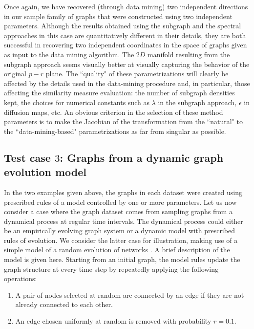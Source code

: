 Once again, we have recovered (through data mining) two independent
directions in our sample family of graphs that were constructed using
two independent parameters.
% 
Although the results obtained using the subgraph and the spectral
approaches in this case are quantitatively different in their details,
they are both successful in recovering two independent coordinates in
the space of graphs given as input to the data mining algorithm.
% 
The $2D$ manifold resulting from the subgraph approach seems visually
better at visually capturing the behavior of the original $p-r$ plane.
% 
The ``quality" of these parametrizations will clearly be affected by
the details used in the data-mining procedure and, in particular,
those affecting the similarity measure evaluation: the number of
subgraph densities kept, the choices for numerical constants such as
$\lambda$ in the subgraph approach, $\epsilon$ in diffusion maps, etc.
% 
An obvious criterion in the selection of these method parameters is to
make the Jacobian of the transformation from the ``natural" to the
``data-mining-based" parametrizations as far from singular as
possible.


\subsection{\label{ss:dm} Test case $3$: Graphs from a dynamic graph
  evolution model}

In the two examples given above, the graphs in each dataset were
created using prescribed rules of a model controlled by one or more
parameters.
% 
Let us now consider a case where the graph dataset comes from sampling
graphs from a dynamical process at regular time intervals.
% 
The dynamical process could either be an empirically evolving graph
system or a dynamic model with prescribed rules of evolution.
% 
We consider the latter case for illustration, making use of a simple
model of a random evolution of networks \cite{bold_equation-free_2014}.
% 
A brief description of the model is given here.
% 
Starting from an initial graph, the model rules update the graph
structure at every time step by repeatedly applying the following
operations:

\begin{enumerate}
\item A pair of nodes selected at random are connected by an edge if
  they are not already connected to each other.
\item An edge chosen uniformly at random is removed with probability
  $r=0.1$.
\end{enumerate}

